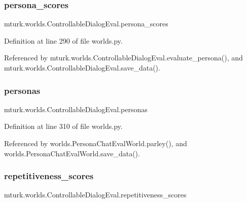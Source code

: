 \subsubsection{\texorpdfstring{persona\+\_\+scores}{persona\_scores}}
{\footnotesize\ttfamily mturk.\+worlds.\+Controllable\+Dialog\+Eval.\+persona\+\_\+scores}



Definition at line 290 of file worlds.\+py.



Referenced by mturk.\+worlds.\+Controllable\+Dialog\+Eval.\+evaluate\+\_\+persona(), and mturk.\+worlds.\+Controllable\+Dialog\+Eval.\+save\+\_\+data().

\mbox{\label{classmturk_1_1worlds_1_1ControllableDialogEval_affdb463b4e65d8444fda2fde560357a9}} 
\subsubsection{\texorpdfstring{personas}{personas}}
{\footnotesize\ttfamily mturk.\+worlds.\+Controllable\+Dialog\+Eval.\+personas}



Definition at line 310 of file worlds.\+py.



Referenced by worlds.\+Persona\+Chat\+Eval\+World.\+parley(), and worlds.\+Persona\+Chat\+Eval\+World.\+save\+\_\+data().

\mbox{\label{classmturk_1_1worlds_1_1ControllableDialogEval_acd1de7afc76429815ca977cd85c399f1}} 
\subsubsection{\texorpdfstring{repetitiveness\+\_\+scores}{repetitiveness\_scores}}
{\footnotesize\ttfamily mturk.\+worlds.\+Controllable\+Dialog\+Eval.\+repetitiveness\+\_\+scores}



